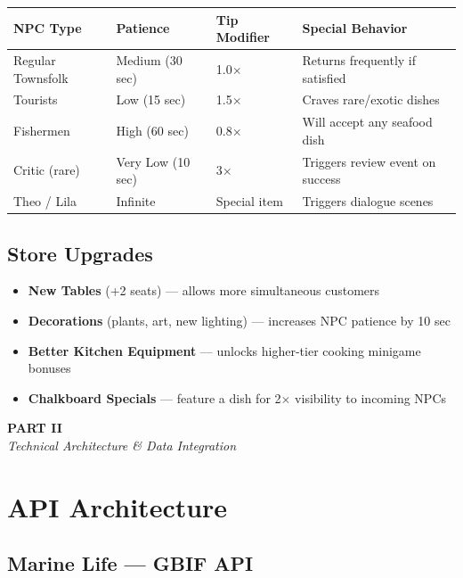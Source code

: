 \documentclass[11pt, letterpaper]{article}
\newcommand{\sectionband}[3]{%
  \begin{tcolorbox}[
    enhanced,
    colback=#3, colframe=#3,
    boxrule=0pt, arc=0pt,
    left=12pt, right=12pt, top=10pt, bottom=10pt,
    beforeafter skip=14pt,
  ]
    {\Large\bfseries\color{white}#1}\\[2pt]
    {\small\itshape\color{#3!30!white}#2}
  \end{tcolorbox}%
}
\newcommand{\altrow}{\rowcolor{rowalt}}
\begin{document}
\vspace{4pt}
\begin{tabularx}{\textwidth}{L{3cm} L{2.4cm} L{2.4cm} L{5.4cm}}
\toprule
{}
\textbf{\color{white}NPC Type} & \textbf{\color{white}Patience} & \textbf{\color{white}Tip Modifier} & \textbf{\color{white}Special Behavior} \\
\midrule
Regular Townsfolk & Medium (30 sec) & 1.0$\times$ & Returns frequently if satisfied \\
\altrow
Tourists          & Low (15 sec)    & 1.5$\times$ & Craves rare/exotic dishes \\
Fishermen         & High (60 sec)   & 0.8$\times$ & Will accept any seafood dish \\
\altrow
Critic (rare)     & Very Low (10 sec) & 3$\times$ & Triggers review event on success \\
Theo / Lila       & Infinite        & Special item & Triggers dialogue scenes \\
\bottomrule
\end{tabularx}

\subsection{Store Upgrades}

\begin{itemize}
  \item \textbf{New Tables} (+2 seats) --- allows more simultaneous customers
  \item \textbf{Decorations} (plants, art, new lighting) --- increases NPC patience by 10 sec
  \item \textbf{Better Kitchen Equipment} --- unlocks higher-tier cooking minigame bonuses
  \item \textbf{Chalkboard Specials} --- feature a dish for 2$\times$ visibility to incoming NPCs
\end{itemize}

\newpage
\sectionband{PART II}{Technical Architecture \& Data Integration}{slate}
\section{API Architecture}

\subsection{Marine Life --- GBIF API}
\end{document}
